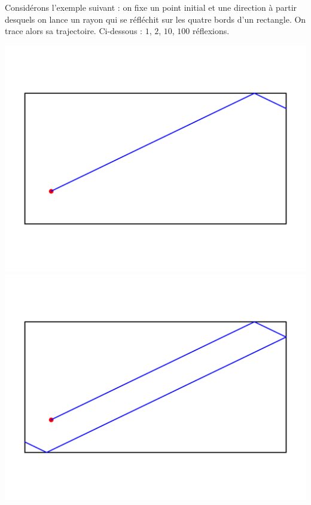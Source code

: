 \documentclass[11pt,class=report,crop=false]{standalone}
\begin{document}
Considérons l'exemple suivant : on fixe un point initial et une direction à partir desquels on lance un rayon qui se réfléchit sur les quatre bords d'un rectangle. On trace alors sa trajectoire.
Ci-dessous : $1$, $2$, $10$, $100$ réflexions.
\begin{center}
	\includegraphics[scale=\myscale,scale=0.45,trim={0 1cm 0 1cm},clip]{figures/optique-1} \quad 
	\includegraphics[scale=\myscale,scale=0.45,trim={0 1cm 0 1cm},clip]{figures/optique-2}	
	

\end{center}
\end{document}
